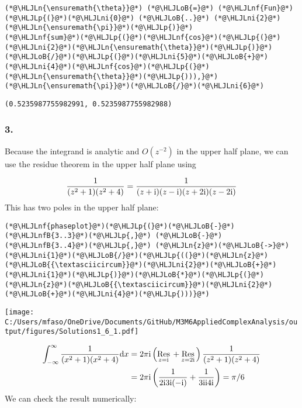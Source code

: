 \documentclass[12pt,landscape]{article}
\newcommand{\HLJLn}[1]{#1}
\newcommand{\HLJLnf}[1]{\textcolor[RGB]{66,102,213}{#1}}
\newcommand{\HLJLnfB}[1]{\textcolor[RGB]{59,151,46}{#1}}
\newcommand{\HLJLni}[1]{\textcolor[RGB]{59,151,46}{#1}}
\newcommand{\HLJLoB}[1]{\textcolor[RGB]{102,102,102}{\textbf{#1}}}
\newcommand{\HLJLp}[1]{#1}
\def\D{ {\rm d} }
\def\I{ {\rm i} }
\def\Res_#1{\underset{#1}{\rm Res}\,}
\def\dx{\D x}
\def\cent#1{\begin{center}#1\end{center} }
\begin{document}
{\begin{lstlisting}
(*@\HLJLn{\ensuremath{\theta}}@*) (*@\HLJLoB{=}@*) (*@\HLJLnf{Fun}@*)(*@\HLJLp{(}@*)(*@\HLJLni{0}@*) (*@\HLJLoB{..}@*) (*@\HLJLni{2}@*)(*@\HLJLn{\ensuremath{\pi}}@*)(*@\HLJLp{)}@*)
(*@\HLJLnf{sum}@*)(*@\HLJLp{(}@*)(*@\HLJLnf{cos}@*)(*@\HLJLp{(}@*)(*@\HLJLni{2}@*)(*@\HLJLn{\ensuremath{\theta}}@*)(*@\HLJLp{)}@*)(*@\HLJLoB{/}@*)(*@\HLJLp{(}@*)(*@\HLJLni{5}@*)(*@\HLJLoB{+}@*)(*@\HLJLni{4}@*)(*@\HLJLnf{cos}@*)(*@\HLJLp{(}@*)(*@\HLJLn{\ensuremath{\theta}}@*)(*@\HLJLp{))),}@*) (*@\HLJLn{\ensuremath{\pi}}@*)(*@\HLJLoB{/}@*)(*@\HLJLni{6}@*)
\end{lstlisting}

\begin{lstlisting}
(0.5235987755982991, 0.5235987755982988)
\end{lstlisting}

\newpage
\subsubsection{3.}
Because the integrand is analytic  and $O(z^{-2})$ in the upper half plane, we can use the residue theorem in the upper half plane using

\[
 {1 \over (z^2+1) (z^2 + 4)} = {1 \over (z+\I)(z-\I) (z+2\I)(z-2\I)}
\]
This has two poles in the upper half plane:


\begin{lstlisting}
(*@\HLJLnf{phaseplot}@*)(*@\HLJLp{(}@*)(*@\HLJLoB{-}@*)(*@\HLJLnfB{3..3}@*)(*@\HLJLp{,}@*) (*@\HLJLoB{-}@*)(*@\HLJLnfB{3..4}@*)(*@\HLJLp{,}@*) (*@\HLJLn{z}@*)(*@\HLJLoB{->}@*) (*@\HLJLni{1}@*)(*@\HLJLoB{/}@*)(*@\HLJLp{((}@*)(*@\HLJLn{z}@*)(*@\HLJLoB{{\textasciicircum}}@*)(*@\HLJLni{2}@*)(*@\HLJLoB{+}@*)(*@\HLJLni{1}@*)(*@\HLJLp{)}@*)(*@\HLJLoB{*}@*)(*@\HLJLp{(}@*)(*@\HLJLn{z}@*)(*@\HLJLoB{{\textasciicircum}}@*)(*@\HLJLni{2}@*)(*@\HLJLoB{+}@*)(*@\HLJLni{4}@*)(*@\HLJLp{)))}@*)
\end{lstlisting}

\cent{\texttt{[image: C:/Users/mfaso/OneDrive/Documents/GitHub/M3M6AppliedComplexAnalysis/output/figures/Solutions1\_6\_1.pdf]}}


\begin{align*}
	\int_{-\infty}^\infty    {1 \over (x^2+1)(x^2+4)} \dx &=
    2 \pi \I \left( \Res_{z = \I} + \Res_{z = 2\I}\right){1 \over (z^2+1)(z^2+4)} \\
    & = 2 \pi \I \left( {1 \over 2 \I 3 \I (-\I)} + {1 \over 3 \I  \I 4\I} \right) = \pi/ 6
\end{align*}
We can check the result numerically:


}
\end{document}
